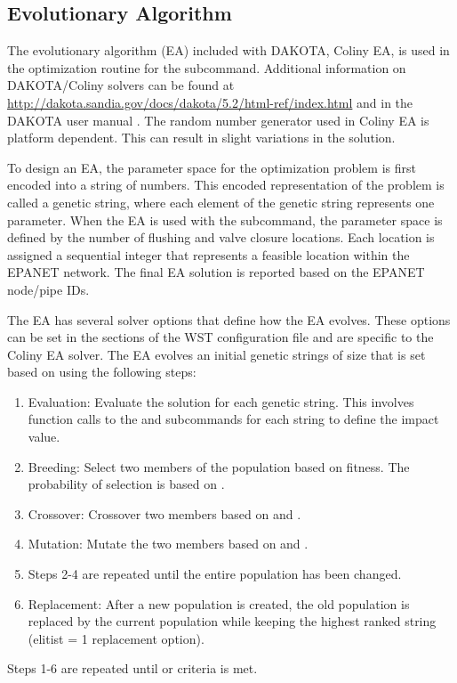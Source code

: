 \subsection{Evolutionary Algorithm}\label{coliny_ea}
The evolutionary algorithm (EA) included with DAKOTA, Coliny EA, is used in the 
optimization routine for the  subcommand. 
Additional information on DAKOTA/Coliny solvers can be found at 
\url{http://dakota.sandia.gov/docs/dakota/5.2/html-ref/index.html}
and in the DAKOTA user manual \citep{DakotaUserManual}.  
The random number generator used in Coliny EA is platform dependent.  
This can result in slight variations in the solution.

To design an EA, the parameter space for the optimization problem 
is first encoded into a string of numbers. This encoded 
representation of the problem is called a genetic string, where each 
element of the genetic string represents one parameter. 
When the EA is used with the  subcommand, the parameter space is defined by the number 
of flushing and valve closure locations. Each location is assigned a sequential 
integer that represents a feasible location within the EPANET network. The final EA solution 
is reported based on the EPANET node/pipe IDs.

The EA has several solver options that define how the EA evolves. These options can be set in the 
\code{[solver][options]} sections of the  WST configuration file and are specific to the Coliny EA solver. 
The EA evolves an initial genetic strings of size  
that is set based on  using the following steps:
\begin{enumerate}
\item Evaluation: Evaluate the solution for each genetic string. This involves function 
calls to the  and  subcommands for each string to define the impact value.  
\item Breeding: Select two members of the population based on fitness. The 
probability of selection is based on .  
\item Crossover: Crossover two members based on  and .
\item Mutation: Mutate the two members based on  and .
\item Steps 2-4 are repeated until the entire population has been changed.
\item Replacement: After a new population is created, the old population is 
replaced by the current population while keeping the highest ranked string 
(elitist = 1 replacement option).
\end{enumerate}
Steps 1-6 are repeated until  or  criteria is met. 

